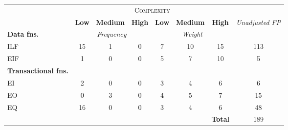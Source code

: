 
\begin{tabular}{|l|c|c|c|c|c|c|c|}
\cline{2-7}
\multicolumn{1}{c}{} & \multicolumn{6}{|c|}{\textsc{Complexity}} & \multicolumn{1}{c}{}  \\ \cline{2-8}
\multicolumn{1}{c|}{} & \textbf{Low} & \textbf{Medium} & \textbf{High} & \textbf{Low} & \textbf{Medium} & \textbf{High} & \multirow{2}{*}{\textit{Unadjusted FP}} \\ \cline{1-7}
\textbf{Data fns.} & \multicolumn{3}{|c|}{\textit{Frequency}} &  \multicolumn{3}{|c|}{\textit{Weight}} & \\ \hline
ILF 	& 15 & 1 & 0 & 7 & 10 & 15 & 113 	\\ \hline
EIF 	& 1  & 0 & 0 & 5 & 7  & 10 & 5		\\ \hline
\textbf{Transactional fns.} & \multicolumn{7}{|c|}{} \\ \hline
EI 		& 2  & 0 & 0 & 3 & 4  & 6  & 6 		\\ \hline
EO 		& 0  & 3 & 0 & 4 & 5  & 7  & 15		\\ \hline
EQ		& 16 & 0 & 0 & 3 & 4  & 6  & 48		\\ \hline
\multicolumn{6}{c|}{} & \textbf{Total} & 189 \\ \cline{7-8}
\end{tabular}
